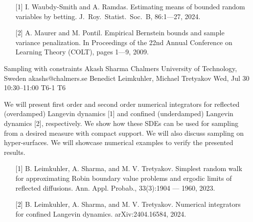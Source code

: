 \begin{talk}
\begin{enumerate}
	\item[{[1]}] I. Waubdy-Smith and A. Ramdas. Estimating means of bounded random
variables by betting. J.\ Roy.\ Statist.\ Soc.\ B, 86:1---27, 2024.
	\item[{[2]}] A. Maurer and M. Pontil. Empirical Bernstein bounds and sample variance penalization. In Proceedings of the 22nd Annual Conference
on Learning Theory (COLT), pages 1---9, 2009.
\end{enumerate}


\end{talk}

\begin{talk}
  {Sampling with constraints}%
  {Akash Sharma}%
  {Chalmers University of Technology, Sweden}%
  {akashs@chalmers.se}%
  {Benedict Leimkuhler, Michael Tretyakov}%
  {}%
  {Wed, Jul 30 10:30–11:00}%
  {T6-1}%
  {T6}%
  
				
			
 We will present first order and second order numerical integrators for reflected (overdamped) Langevin dynamics [1] and confined (underdamped) Langevin dynamics [2], respectively. We show how these SDEs can be used for sampling from a desired measure with compact support. We will also discuss sampling on hyper-surfaces. We will showcase numerical examples to verify the presented results.  

\medskip  

\begin{enumerate}
	\item[{[1]}] B. Leimkuhler, A. Sharma, and M. V. Tretyakov. Simplest random walk for approximating Robin boundary
value problems and ergodic limits of reflected diffusions. Ann. Appl. Probab., 33(3):1904 --- 1960, 2023.
	\item[{[2]}] B. Leimkuhler, A. Sharma, and M. V. Tretyakov. Numerical integrators for confined Langevin dynamics.  
arXiv:2404.16584, 2024.
\end{enumerate}


\end{talk}

